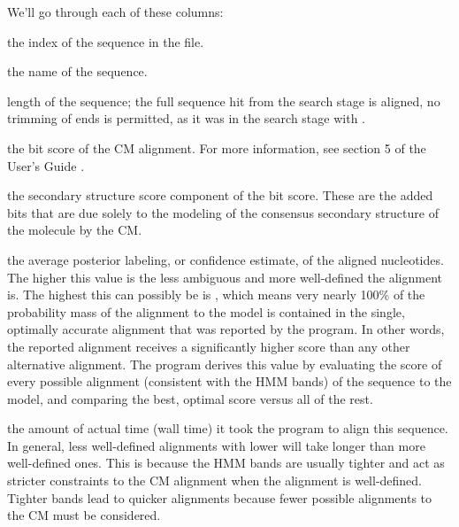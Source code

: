 We'll go through each of these columns:

\begin{wideitem}
\item[\emprog{seq idx}] the index of the sequence in the file.

\item[\emprog{seq name}] the name of the sequence.

\item[\emprog{len}] length of the sequence; the full sequence hit from 
  the search stage is aligned, no trimming of ends is permitted, as it was in the search
  stage with .

\item[\emprog{total}] the bit score of the CM alignment. For more
  information, see section 5 of the  User's Guide \cite{Nawrocki09}.

\item[\emprog{struct}] the secondary structure score component of the
   bit score. These are the added bits that are due solely
  to the modeling of the consensus secondary structure of the
  molecule by the CM\@. 
  
\item[\emprog{avg prob}] the average posterior labeling, or confidence
  estimate, of the aligned nucleotides. The higher this value is the less
  ambiguous and more well-defined the alignment is. The highest this
  can possibly be is , which means very nearly 100\% of
  the probability mass of the alignment to the model is contained in
  the single, optimally accurate alignment that was reported by the
  program. In other words, the reported alignment receives a
  significantly higher score than any other alternative alignment. The
  program derives this value by evaluating the score of every possible
  alignment (consistent with the HMM bands) of the sequence to the
  model, and comparing the best, optimal score versus all of the
  rest. 

\item[\emprog{elapsed}] the amount of actual time (wall time) it took
  the program to align this sequence. In general, less well-defined
  alignments with lower  will take longer than more
  well-defined ones. This is because the HMM bands are usually tighter
  and act as stricter constraints to the CM alignment when the
  alignment is well-defined. Tighter bands lead to quicker alignments
  because fewer possible alignments to the CM must be considered.
\end{wideitem}

